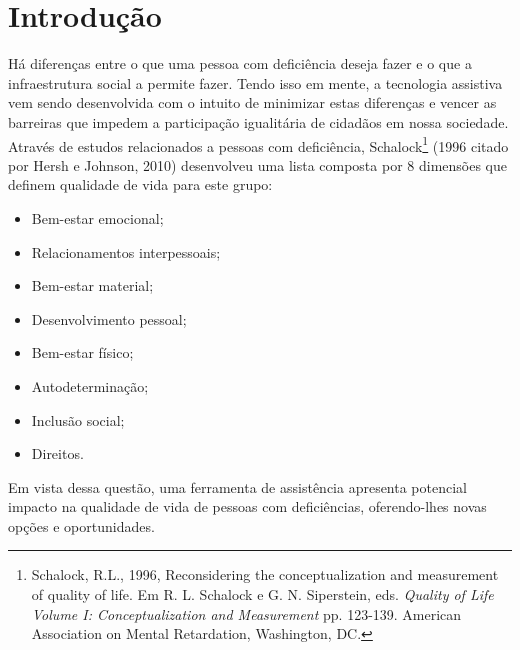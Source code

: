 \chapter{\label{chap:intro}Introdução}


Há diferenças entre o que uma pessoa com deficiência deseja fazer e o que a infraestrutura social a permite fazer. Tendo isso em mente, a tecnologia assistiva vem sendo desenvolvida com o intuito de minimizar estas diferenças e vencer as barreiras que impedem a participação igualitária de cidadãos em nossa sociedade. Através de estudos relacionados a pessoas com deficiência, Schalock\footnote{Schalock, R.L., 1996, Reconsidering the conceptualization and measurement of quality of life. Em R. L. Schalock e G. N. Siperstein, eds. \emph{Quality of Life Volume I: Conceptualization and Measurement} pp. 123-139. American Association on Mental Retardation, Washington, DC.} (1996 citado por Hersh e Johnson, 2010)\nocite{HERSH2010ASSISTIVE} desenvolveu uma lista composta por 8 dimensões que definem qualidade de vida para este grupo:
\begin{itemize}
    \item Bem-estar emocional;
    \item Relacionamentos interpessoais;
    \item Bem-estar material;
    \item Desenvolvimento pessoal;
    \item Bem-estar físico;
    \item Autodeterminação;
    \item Inclusão social;
    \item Direitos.
\end{itemize}
Em vista dessa questão, uma ferramenta de assistência apresenta potencial impacto na qualidade de vida de pessoas com deficiências, oferendo-lhes novas opções e oportunidades.


